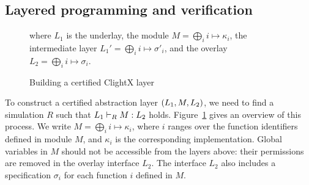 \subsection{Layered programming and verification}
\label{sec:clightx-prog}

\begin{figure}[t]
    \begin{prooftree}
    \end{prooftree}
    where $L_1$ is the underlay, the module $M = \bigoplus_i i \mapsto \kappa_i$, the intermediate layer $L_1' = \bigoplus_i i \mapsto \sigma'_i$, and the overlay $L_2 = \bigoplus_i i \mapsto \sigma_i$.
    \caption{Building a certified ClightX layer}
    \label{fig:lprooftree}
\hrulefill
    \afterpage{\FloatBarrier}
\end{figure}

To construct a certified abstraction layer $\layer{L_1}{M}{L_2}$, we
need to find a simulation $R$ such that $\ltyp{L_1}{R}{M}{L_2}$ holds.
Figure~\ref{fig:lprooftree} gives an overview of this process.  We write
$M = \bigoplus_i i \mapsto \kappa_i$, where $i$ ranges over the
function identifiers defined in module $M$, and $\kappa_i$ is the
corresponding implementation.  Global variables in $M$ should not
be accessible from the layers above: their permissions are removed in
the overlay interface $L_2$.  The interface $L_2$ also includes a
specification $\sigma_i$ for each function $i$ defined in $M$.

